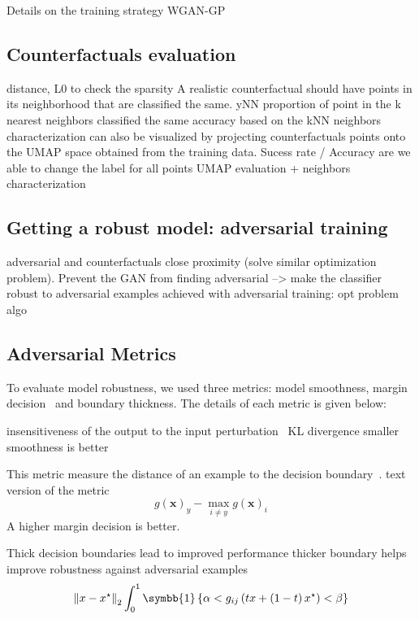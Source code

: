 \documentclass[../main.tex]{subfiles}
\begin{document}
		Details on the training strategy WGAN-GP
	\subsection{Counterfactuals evaluation}
		distance, L0 to check the sparsity
		A realistic counterfactual should have points in its neighborhood that are classified the same.
		yNN proportion of point in the k nearest neighbors classified the same accuracy based on the kNN neighbors characterization \cite{Carla_CF}
		can also be visualized by projecting counterfactuals points onto the UMAP space obtained from the training data.
		Sucess rate / Accuracy are we able to change the label for all points
		UMAP evaluation + neighbors characterization

	\subsection{Getting a robust model: adversarial training}
		adversarial and counterfactuals close proximity (solve similar optimization problem).
		Prevent the GAN from finding adversarial --> make the classifier robust to adversarial examples
		achieved with adversarial training: opt problem
		algo

	\subsection{Adversarial Metrics}
		To evaluate model robustness, we used three metrics: model smoothness, margin decision~\cite{MarginDecision} and boundary thickness.
		The details of each metric is given below:
		\begin{description}[
				style=multiline,
				leftmargin=!,
				labelwidth=2.5cm
			]
			\item[Model smoothness]
				insensitiveness of the output to the input perturbation~\cite{MarginDecision}
				KL divergence
				smaller smoothness is better
			\item[Margin decision]
				This metric measure the distance of an example to the decision boundary~\cite{MarginDecision}.
				text version of the metric
				\begin{equation}
					g\left(\symbf{x}\right)_{y} - \max_{i \neq y} g\left(\symbf{x}\right)_{i}
				\end{equation}
				A higher margin decision is better.
			\item[Boundary thickness]
				Thick decision boundaries lead to improved performance
				thicker boundary helps improve robustness against adversarial examples
				\begin{equation}
					\left\|x - x^{\star}\right\|_{2} \int_{0}^{1} \symbb{1}\left\{ \alpha < g_{ij}\left(tx + \left(1-t\right)x^{\star} \right) < \beta\right\}
				\end{equation}
		\end{description}
\end{document}
